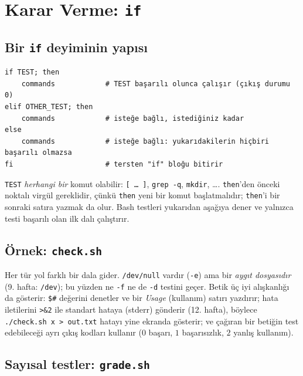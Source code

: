 \documentclass[11pt,a4paper]{article}
\newcommand{\cmd}[1]{\texttt{#1}}
\begin{document}
\section{Karar Verme: \texttt{if}}

\subsection{Bir \texttt{if} deyiminin yapısı}

\begin{lstlisting}[style=sh,numbers=none]
if TEST; then
    commands            # TEST başarılı olunca çalışır (çıkış durumu 0)
elif OTHER_TEST; then
    commands            # isteğe bağlı, istediğiniz kadar
else
    commands            # isteğe bağlı: yukarıdakilerin hiçbiri başarılı olmazsa
fi                      # tersten "if" bloğu bitirir
\end{lstlisting}
\texttt{TEST} \emph{herhangi bir} komut olabilir: \texttt{[ \ldots\ ]}, \cmd{grep -q}, \cmd{mkdir}, \ldots. \texttt{then}'den önceki noktalı virgül gereklidir, çünkü \texttt{then} yeni bir komut başlatmalıdır; \texttt{then}'i bir sonraki satıra yazmak da olur. Bash testleri yukarıdan aşağıya dener ve yalnızca testi başarılı olan ilk dalı çalıştırır.

\subsection{Örnek: \texttt{check.sh}}




Her tür yol farklı bir dala gider. \texttt{/dev/null} vardır (\texttt{-e}) ama bir \emph{aygıt dosyasıdır} (9. hafta: \texttt{/dev}); bu yüzden ne \texttt{-f} ne de \texttt{-d} testini geçer. Betik üç iyi alışkanlığı da gösterir: \texttt{\$\#} değerini denetler ve bir \emph{Usage} (kullanım) satırı yazdırır; hata iletilerini \texttt{>\&2} ile standart hataya (stderr) gönderir (12. hafta), böylece \texttt{./check.sh x > out.txt} hatayı yine ekranda gösterir; ve çağıran bir betiğin test edebileceği ayrı çıkış kodları kullanır ($0$ başarı, $1$ başarısızlık, $2$ yanlış kullanım).

\subsection{Sayısal testler: \texttt{grade.sh}}
\end{document}
